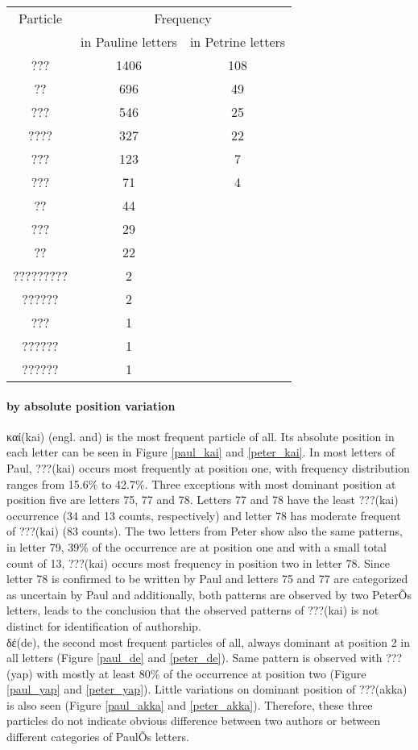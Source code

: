 \documentclass[a4paper]{article}
\renewcommand{\textgreek}[1]{{\selectlanguage{greek}#1}}
\begin{document}
{\renewcommand{\arraystretch}{1.3}
\begin{tabular}{ccc}
\hline
Particle &	\multicolumn{2}{c}{Frequency} \\
\cline{2-3}
&in Pauline letters  & in Petrine letters \\
\hline
??? & 1406 & 108 \\
??	& 696 & 49 \\
???	& 546 &25 \\
????	 & 327&22 \\
???	& 123 &7 \\
???  & 71 & 4 \\
??    & 44&	\\
???  & 29	& \\
??    & 22	& \\
????????? & 2	& \\
?????? &	2& \\	
???  & 1	& \\
?????? & 1 &\\
?????? & 1&	\\
\hline
\end{tabular}
}

\paragraph{by absolute position variation}
\textgreek{καί}(kai) (engl. and) is the most frequent particle of all. Its absolute position in each letter can be seen in Figure \ref{paul_kai} and \ref{peter_kai}. In most letters of Paul, ???(kai) occurs most frequently at position one, with frequency distribution ranges from 15.6\%  to 42.7\%. Three exceptions with most dominant position at position five are letters 75, 77 and 78. Letters 77 and 78 have the least ???(kai) occurrence (34 and 13 counts, respectively) and letter 78 has moderate frequent of ???(kai) (83 counts). The two letters from Peter show also the same patterns, in letter 79, 39\% of the occurrence are at position one and with a small total count of 13, ???(kai) occurs most frequency in position two in letter 78. Since letter 78 is confirmed to be written by Paul and letters 75 and 77 are categorized as uncertain by Paul and additionally, both patterns are observed by two PeterÕs letters, leads to the conclusion that the observed patterns of ???(kai) is not distinct for identification of authorship.\\

\textgreek{δέ}(de), the second most frequent particles of all, always dominant at position 2 in all letters (Figure \ref{paul_de} and \ref{peter_de}). Same pattern is observed with ???(yap) with mostly at least 80\% of the occurrence at position two (Figure \ref{paul_yap} and \ref{peter_yap}). Little variations on dominant position of ???(akka) is also seen (Figure \ref{paul_akka} and \ref{peter_akka}). Therefore, these three particles do not indicate obvious difference between two authors or between different categories of PaulÕs letters. 
\end{document}
